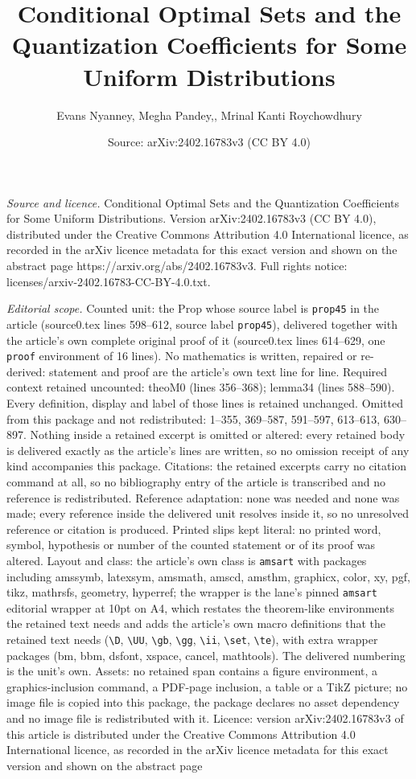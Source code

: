 \documentclass[10pt,a4paper]{amsart}
\title[Conditional Optimal Sets and the Quantization Coefficients f]{Conditional Optimal Sets and the Quantization Coefficients for Some Uniform Distributions}
\author{Evans Nyanney, Megha Pandey,, Mrinal Kanti Roychowdhury}
\date{Source: arXiv:2402.16783v3 (CC BY 4.0)}
\begin{document}
\maketitle

\noindent\emph{Source and licence.} Conditional Optimal Sets and the Quantization Coefficients for Some Uniform Distributions. Version arXiv:2402.16783v3 (CC BY 4.0), distributed under the Creative Commons Attribution 4.0 International licence, as recorded in the arXiv licence metadata for this exact version and shown on the abstract page https://arxiv.org/abs/2402.16783v3. Full rights notice: licenses/arxiv-2402.16783-CC-BY-4.0.txt.\par\smallskip

\noindent\textit{Editorial scope.} Counted unit: the Prop whose source label is \texttt{prop45} in the article (source0.tex lines 598--612, source label \texttt{prop45}), delivered together with the article's own complete original proof of it (source0.tex lines 614--629, one \texttt{proof} environment of 16 lines). No mathematics is written, repaired or re-derived: statement and proof are the article's own text line for line. Required context retained uncounted: theoM0 (lines 356--368); lemma34 (lines 588--590). Every definition, display and label of those lines is retained unchanged. Omitted from this package and not redistributed: 1--355, 369--587, 591--597, 613--613, 630--897. Nothing inside a retained excerpt is omitted or altered: every retained body is delivered exactly as the article's lines are written, so no omission receipt of any kind accompanies this package. Citations: the retained excerpts carry no citation command at all, so no bibliography entry of the article is transcribed and no reference is redistributed. Reference adaptation: none was needed and none was made; every reference inside the delivered unit resolves inside it, so no unresolved reference or citation is produced. Printed slips kept literal: no printed word, symbol, hypothesis or number of the counted statement or of its proof was altered. Layout and class: the article's own class is \texttt{amsart} with packages including amssymb, latexsym, amsmath, amscd, amsthm, graphicx, color, xy, pgf, tikz, mathrsfs, geometry, hyperref; the wrapper is the lane's pinned \texttt{amsart} editorial wrapper at 10pt on A4, which restates the theorem-like environments the retained text needs and adds the article's own macro definitions that the retained text needs (\texttt{\textbackslash D}, \texttt{\textbackslash UU}, \texttt{\textbackslash gb}, \texttt{\textbackslash gg}, \texttt{\textbackslash ii}, \texttt{\textbackslash set}, \texttt{\textbackslash te}), with extra wrapper packages (bm, bbm, dsfont, xspace, cancel, mathtools). The delivered numbering is the unit's own. Assets: no retained span contains a figure environment, a graphics-inclusion command, a PDF-page inclusion, a table or a TikZ picture; no image file is copied into this package, the package declares no asset dependency and no image file is redistributed with it. Licence: version arXiv:2402.16783v3 of this article is distributed under the Creative Commons Attribution 4.0 International licence, as recorded in the arXiv licence metadata for this exact version and shown on the abstract page 
\end{document}
